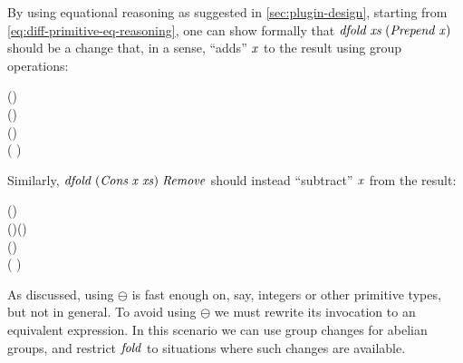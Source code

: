 By using equational reasoning as suggested in \cref{sec:plugin-design}, starting
from \cref{eq:diff-primitive-eq-reasoning},
one can show formally that \ensuremath{\Varid{dfold}\;\Varid{xs}\;(\Conid{Prepend}\;\Varid{x})} should be a change that,
in a sense, ``adds'' \ensuremath{\Varid{x}} to the result using group operations:
\begin{hscode}\SaveRestoreHook
{}%
%
%
%
\>[8]{}\;\;(\;){}\<[E]%
\\
\>[B]{}\Doe{}\<[BE]%
\>[8]{}\;(\oplus {}\;)\ominus {}\;\<[E]%
\\
\>[B]{}\mathrel{=}{}\<[BE]%
\>[8]{}\;(\;\;)\ominus {}\;\<[E]%
\\
\>[B]{}\mathrel{=}{}\<[BE]%
\>[8]{}( \diamond {}\;)\ominus {}\;\<[E]%
\ColumnHook
\end{hscode}\resethooks
Similarly, \ensuremath{\Varid{dfold}\;(\Conid{Cons}\;\Varid{x}\;\Varid{xs})\;\Conid{Remove}} should instead ``subtract'' \ensuremath{\Varid{x}} from the result:
\begin{hscode}\SaveRestoreHook
{}%
%
%
%
\>[8]{}\;(\;\;)\;\<[E]%
\\
\>[B]{}\Doe{}\<[BE]%
\>[8]{}\;(\;\;\oplus {})\ominus {}\;(\;\;){}\<[E]%
\\
\>[B]{}\mathrel{=}{}\<[BE]%
\>[8]{}\;\ominus {}\;(\;\;){}\<[E]%
\\
\>[B]{}\mathrel{=}{}\<[BE]%
\>[8]{}\;\ominus ( \diamond {}\;){}\<[E]%
\ColumnHook
\end{hscode}\resethooks
As discussed, using \ensuremath{\ominus } is fast enough on, say, integers or other
primitive types, but not in general.
To avoid using \ensuremath{\ominus } we must rewrite its invocation to an equivalent expression.
In this scenario we can use group changes for abelian groups, and restrict \ensuremath{\Varid{fold}} to
situations where such changes are available.

